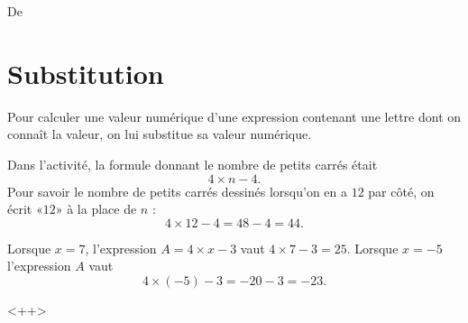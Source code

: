 

De \cite{NRHooXFvgpp}



\section{Substitution}

\begin{Aretenir}
    Pour calculer une valeur numérique d'une expression contenant une lettre dont on connaît la valeur, on lui substitue sa valeur numérique.
\end{Aretenir}

\begin{example}
    Dans l'activité, la formule donnant le nombre de petits carrés était
    \begin{equation}
        4\times n-4.
    \end{equation}
    Pour savoir le nombre de petits carrés dessinés lorsqu'on en a \( 12\) par côté, on écrit «\( 12\)» à la place de \( n\) :
    \begin{equation}
        4\times 12-4=48-4=44.
    \end{equation}
\end{example}

\begin{example}
    Lorsque \( x=7\), l'expression \( A=4\times x-3\) vaut \( 4\times 7-3=25\). Lorsque \( x=-5\) l'expression \( A\) vaut
    \begin{equation}
        4\times (-5)-3=-20-3=-23.
    \end{equation}
\end{example}
<++>


